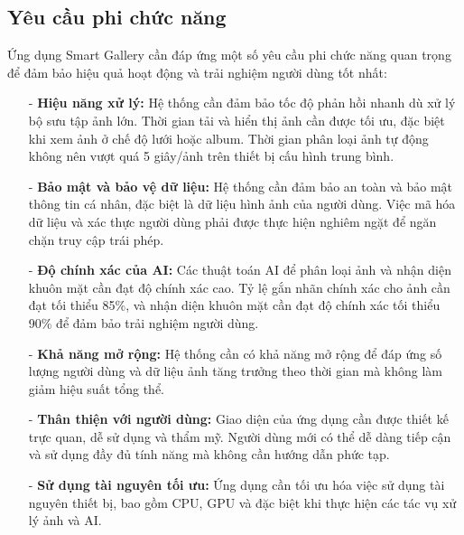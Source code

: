 \subsection{Yêu cầu phi chức năng}

Ứng dụng Smart Gallery cần đáp ứng một số yêu cầu phi chức năng quan trọng để đảm bảo hiệu quả hoạt động và trải nghiệm người dùng tốt nhất:

\begin{itemize}
    \item[-] \textbf{Hiệu năng xử lý:} Hệ thống cần đảm bảo tốc độ phản hồi nhanh dù xử lý bộ sưu tập ảnh lớn. Thời gian tải và hiển thị ảnh cần được tối ưu, đặc biệt khi xem ảnh ở chế độ lưới hoặc album. Thời gian phân loại ảnh tự động không nên vượt quá 5 giây/ảnh trên thiết bị cấu hình trung bình.
    
    \item[-] \textbf{Bảo mật và bảo vệ dữ liệu:} Hệ thống cần đảm bảo an toàn và bảo mật thông tin cá nhân, đặc biệt là dữ liệu hình ảnh của người dùng. Việc mã hóa dữ liệu và xác thực người dùng phải được thực hiện nghiêm ngặt để ngăn chặn truy cập trái phép.
    
    \item[-] \textbf{Độ chính xác của AI:} Các thuật toán AI để phân loại ảnh và nhận diện khuôn mặt cần đạt độ chính xác cao. Tỷ lệ gắn nhãn chính xác cho ảnh cần đạt tối thiểu 85\%, và nhận diện khuôn mặt cần đạt độ chính xác tối thiểu 90\% để đảm bảo trải nghiệm người dùng.
    
    \item[-] \textbf{Khả năng mở rộng:} Hệ thống cần có khả năng mở rộng để đáp ứng số lượng người dùng và dữ liệu ảnh tăng trưởng theo thời gian mà không làm giảm hiệu suất tổng thể.
    
    \item[-] \textbf{Thân thiện với người dùng:} Giao diện của ứng dụng cần được thiết kế trực quan, dễ sử dụng và thẩm mỹ. Người dùng mới có thể dễ dàng tiếp cận và sử dụng đầy đủ tính năng mà không cần hướng dẫn phức tạp.
    
    \item[-] \textbf{Sử dụng tài nguyên tối ưu:} Ứng dụng cần tối ưu hóa việc sử dụng tài nguyên thiết bị, bao gồm CPU, GPU và đặc biệt khi thực hiện các tác vụ xử lý ảnh và AI.
    
    

\end{itemize}
